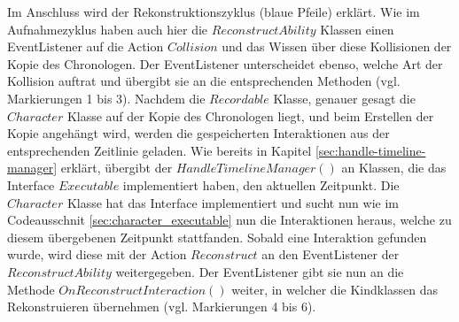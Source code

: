 Im Anschluss wird der Rekonstruktionszyklus (blaue Pfeile) erklärt.
Wie im Aufnahmezyklus haben auch hier die $ReconstructAbility$ Klassen einen EventListener auf die Action $Collision$ und das Wissen über diese Kollisionen der Kopie des Chronologen. Der EventListener unterscheidet ebenso, welche Art der Kollision auftrat und übergibt sie an die entsprechenden Methoden (vgl. Markierungen 1 bis 3). 
Nachdem die $Recordable$ Klasse, genauer gesagt die $Character$ Klasse auf der Kopie des Chronologen liegt, und beim Erstellen der Kopie angehängt wird, werden die gespeicherten Interaktionen aus der entsprechenden Zeitlinie geladen. Wie bereits in Kapitel \ref{sec:handle-timeline-manager} erklärt, übergibt der $HandleTimelineManager()$ an Klassen, die das Interface $Executable$ implementiert haben, den aktuellen Zeitpunkt. Die $Character$ Klasse hat das Interface implementiert und sucht nun wie im Codeausschnit \ref{sec:character_executable} nun die Interaktionen heraus, welche zu diesem übergebenen Zeitpunkt stattfanden. Sobald eine Interaktion gefunden wurde, wird diese mit der Action $Reconstruct$ an den EventListener der $ReconstructAbility$ weitergegeben. Der EventListener gibt sie nun an die Methode $OnReconstructInteraction()$ weiter, in welcher die Kindklassen das Rekonstruieren übernehmen (vgl. Markierungen 4 bis 6).

